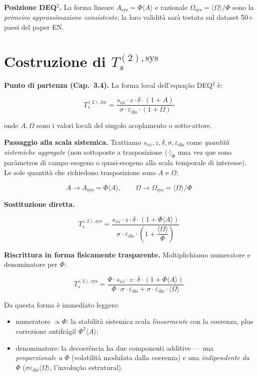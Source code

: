 \Proved{} \textbf{Posizione DEQ$^2$. } La forma lineare
\(A_{\text{sys}} = \Phi\langle A\rangle\) e razionale
\(\Omega_{\text{sys}} = \langle\Omega\rangle/\Phi\) sono la \emph{primeiro
approssimazione consistente}; la loro validità sarà testata sul dataset
50+ paesi del paper EN.



\section{\texorpdfstring{Costruzione di
\(T_s^{(2),\text{sys}}\)}{Costruzione di T\_s\^{}\{(2),\textbackslash text\{sys\}\}}}\label{costruzione-di-t_s2textsys}

\Proved{} \textbf{Punto di partenza (Cap.~3.4).} La forma local
dell'equação DEQ$^2$ è:

\[
T_s^{(2),\text{loc}} = \frac{s_{iii} \cdot z \cdot \delta \cdot (1+A)}{\sigma \cdot \varepsilon_{\text{dis}} \cdot (1+\Omega)}
\]

onde \(A, \Omega\) sono i valori locali del singolo acoplamento o
sotto-attore.

\Hypoth{} \textbf{Passaggio alla scala sistemica.} Trattiamo
\(s_{iii}, z, \delta, \sigma, \varepsilon_{\text{dis}}\) come
\emph{quantità sistemiche aggregate} (non sottoposte a trasposizione
\(\langle \cdot \rangle_\Phi\) uma vez que sono parâmetros di campo esogeno o
quasi-esogeno alla scala temporale di interesse). Le sole quantità che
richiedono trasposizione sono \(A\) e \(\Omega\):

\[
A \to A_{\text{sys}} = \Phi \langle A\rangle, \qquad \Omega \to \Omega_{\text{sys}} = \langle\Omega\rangle/\Phi
\]

\Proved{} \textbf{Sostituzione diretta.}

\[
\boxed{T_s^{(2),\text{sys}} = \frac{s_{iii} \cdot z \cdot \delta \cdot (1 + \Phi \langle A\rangle)}{\sigma \cdot \varepsilon_{\text{dis}} \cdot \left(1 + \dfrac{\langle\Omega\rangle}{\Phi}\right)}}
\]

\Proved{} \textbf{Riscrittura in forma fisicamente trasparente.}
Moltiplichiamo numeratore e denominatore per \(\Phi\):

\[
T_s^{(2),\text{sys}} = \frac{\Phi \cdot s_{iii} \cdot z \cdot \delta \cdot (1 + \Phi \langle A\rangle)}{\Phi \cdot \sigma \cdot \varepsilon_{\text{dis}} + \sigma \cdot \varepsilon_{\text{dis}} \cdot \langle\Omega\rangle}
\]

Da questa forma è immediato leggere:

\begin{itemize}
\tightlist
\item
  numeratore \(\propto \Phi\): la stabilità sistemica scala
  \emph{linearmente} con la coerenza, plus correzione antifrágil
  \(\Phi^2 \langle A\rangle\);
\item
  denominatore: la decoerência ha due componenti additive --- una
  \emph{proporzionale a \(\Phi\)} (volatilità modulata dalla coerenza) e
  una \emph{indipendente da \(\Phi\)}
  (\(\sigma \varepsilon_{\text{dis}} \langle\Omega\rangle\),
  l'involução estrutural).
\end{itemize}



